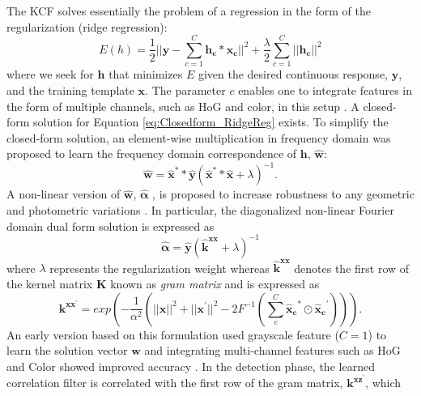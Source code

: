 \documentclass[10pt,twocolumn,letterpaper]{article}
\begin{document}
The KCF solves essentially the problem of a regression in the form of
the regularization (ridge regression):
\begin{equation}
E(h) = \frac{1}{2}||\mathbf{y}-\sum_{c=1}^{C}\mathbf{h_{c}}*\mathbf{x_{c}}||^{2} + \frac{\lambda}{2}\sum_{c=1}^{C}||\mathbf{h_{c}}||^{2}
\label{eq:Closedform_RidgeReg}
\end{equation}
where we seek for $\mathbf{h}$ that minimizes $E$ given the desired
continuous response, $\mathbf{y}$, and the training template
$\mathbf{x}$.  The parameter $c$ enables one to integrate features in
the form of multiple channels, such as HoG and color, in this setup
\cite{henriques2015high,galoogahi2013multi}.  A closed-form solution
for Equation \ref{eq:Closedform_RidgeReg} exists. To simplify the
closed-form solution, an element-wise multiplication in frequency
domain was proposed to learn the frequency domain correspondence of
$\mathbf{h}$, $\mathbf{\hat{w}}$:
\begin{equation}
\mathbf{\hat{w}} = \mathbf{\hat{x}^{*}}*\mathbf{\hat{y}}(\mathbf{\hat{x}^{*}}*\mathbf{\hat{x}}+\lambda)^{-1}.
\label{eq:DiagonalizedPrimalSolution}
\end{equation}
A non-linear version of $\mathbf{\hat{w}}$, $\mathbf{\hat{\alpha}}$ , is proposed to increase robustness
to any geometric and photometric variations
\cite{henriques2015high}. In particular, the diagonalized non-linear Fourier
domain dual form solution is expressed as
\begin{equation}
\mathbf{\hat{\alpha}} = \mathbf{\hat{y}}(\mathbf{\hat{k}^{xx}}+\lambda)^{-1}
\label{eq:FourierDualDomainSolution}
\end{equation}
where $\lambda$ represents the regularization weight whereas $\mathbf{\hat{k}^{xx}}$ denotes
 the first row of the kernel matrix $\mathbf{K}$ known as \textit{gram matrix} and is expressed as
\begin{equation}
\mathbf{k^{xx^{'}}} = exp(-\dfrac{1}{\alpha^{2}}(||\mathbf{x}||^{2}+||\mathbf{x}^{'}||^{2}-2F^{-1}(\sum^{C}_{c}\mathbf{\hat{x}_{c}}^{*}\odot \mathbf{\hat{x}_{c}}^{'}))).
\label{eq:GaussianCorrelationSingleChannel}
\end{equation}
An early version based on this formulation used grayscale feature
($C=1$) to learn the solution vector $\mathbf{w}$ and integrating
multi-channel features such as HoG and Color showed improved accuracy
\cite{henriques2015high,galoogahi2013multi,tang2015multi,ma2015long,bibi2015multi}.
In the detection phase, the learned correlation filter is correlated
with the first row of the gram matrix, $\mathbf{k^{xz^{'}}}$, which
\end{document}
